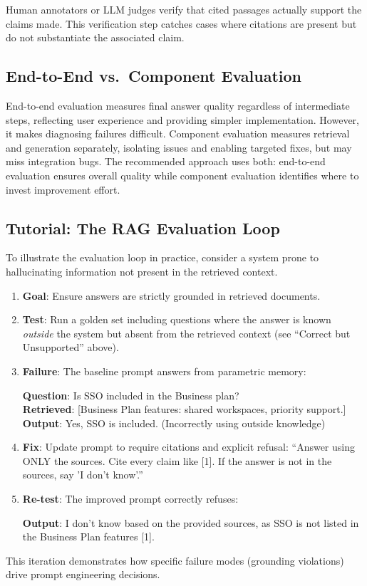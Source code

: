 Human annotators or LLM judges verify that cited passages actually support the claims made. This verification step catches cases where citations are present but do not substantiate the associated claim.

\subsection{End-to-End vs.\ Component Evaluation}

End-to-end evaluation measures final answer quality regardless of intermediate steps, reflecting user experience and providing simpler implementation. However, it makes diagnosing failures difficult. Component evaluation measures retrieval and generation separately, isolating issues and enabling targeted fixes, but may miss integration bugs. The recommended approach uses both: end-to-end evaluation ensures overall quality while component evaluation identifies where to invest improvement effort.

\subsection{Tutorial: The RAG Evaluation Loop}

To illustrate the evaluation loop in practice, consider a system prone to hallucinating information not present in the retrieved context.

\begin{enumerate}
    \item \textbf{Goal}: Ensure answers are strictly grounded in retrieved documents.
    \item \textbf{Test}: Run a golden set including questions where the answer is known \emph{outside} the system but absent from the retrieved context (see ``Correct but Unsupported'' above).
    \item \textbf{Failure}: The baseline prompt answers from parametric memory:
    \begin{badexample}
    \textbf{Question}: Is SSO included in the Business plan? \\
    \textbf{Retrieved}: [Business Plan features: shared workspaces, priority support.] \\
    \textbf{Output}: Yes, SSO is included. (Incorrectly using outside knowledge)
    \end{badexample}
    \item \textbf{Fix}: Update prompt to require citations and explicit refusal: ``Answer using ONLY the sources. Cite every claim like [1]. If the answer is not in the sources, say 'I don't know'.''
    \item \textbf{Re-test}: The improved prompt correctly refuses:
    \begin{goodexample}
    \textbf{Output}: I don't know based on the provided sources, as SSO is not listed in the Business Plan features [1].
    \end{goodexample}
\end{enumerate}

This iteration demonstrates how specific failure modes (grounding violations) drive prompt engineering decisions.


